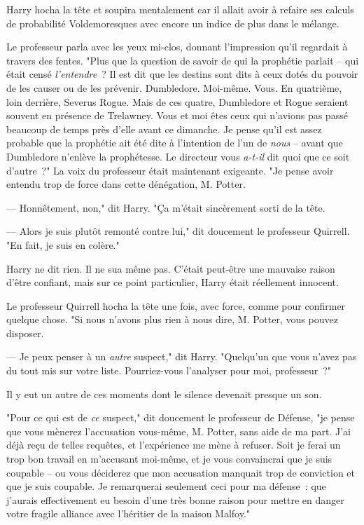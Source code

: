 Harry hocha la tête et soupira mentalement car il allait avoir à refaire ses calculs de probabilité Voldemoresques avec encore un indice de plus dans le mélange.

Le professeur parla avec les yeux mi-clos, donnant l'impression qu'il regardait à travers des fentes. "Plus que la question de savoir de qui la prophétie parlait -- qui était censé \emph{l'entendre}~? Il est dit que les destins sont dits à ceux dotés du pouvoir de les causer ou de les prévenir. Dumbledore. Moi-même. Vous. En quatrième, loin derrière, Severus Rogue. Mais de ces quatre, Dumbledore et Rogue seraient souvent en présence de Trelawney. Vous et moi êtes ceux qui n'avions pas passé beaucoup de temps près d'elle avant ce dimanche. Je pense qu'il est assez probable que la prophétie ait été dite à l'intention de l'un de \emph{nous} -- avant que Dumbledore n'enlève la prophétesse. Le directeur vous \emph{a-t-il} dit quoi que ce soit d'autre~?" La voix du professeur était maintenant exigeante. "Je pense avoir entendu trop de force dans cette dénégation, M. Potter.

--- Honnêtement, non," dit Harry. "Ça m'était sincèrement sorti de la tête.

--- Alors je suis plutôt remonté contre lui," dit doucement le professeur Quirrell. "En fait, je suis en colère."

Harry ne dit rien. Il ne sua même pas. C'était peut-être une mauvaise raison d'être confiant, mais sur ce point particulier, Harry était réellement innocent.

Le professeur Quirrell hocha la tête une fois, avec force, comme pour confirmer quelque chose. "Si nous n'avons plus rien à nous dire, M. Potter, vous pouvez disposer.

--- Je peux penser à un \emph{autre} suspect," dit Harry. "Quelqu'un que vous n'avez pas du tout mis sur votre liste. Pourriez-vous l'analyser pour moi, professeur~?"

Il y eut un autre de ces moments dont le silence devenait presque un son.

"Pour ce qui est de \emph{ce} suspect," dit doucement le professeur de Défense, "je pense que vous mènerez l'accusation vous-même, M. Potter, sans aide de ma part. J'ai déjà reçu de telles requêtes, et l'expérience me mène à refuser. Soit je ferai un trop bon travail en m'accusant moi-même, et je vous convaincrai que je suis coupable -- ou vous déciderez que mon accusation manquait trop de conviction et que je suis coupable. Je remarquerai seulement ceci pour ma défense~: que j'aurais effectivement eu besoin d'une très bonne raison pour mettre en danger votre fragile alliance avec l'héritier de la maison Malfoy."

